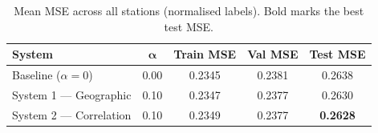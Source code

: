 \begin{table}[t]
  \centering
  \caption{Mean MSE across all stations (normalised labels). Bold marks the best test MSE.}
  \label{tab:results}
  \begin{tabular}{lcccc}
    \hline
    \textbf{System} & $\bm{\alpha}$ & \textbf{Train MSE} & \textbf{Val MSE} & \textbf{Test MSE} \\
    \hline
    Baseline ($\alpha=0$) & 0.00 & 0.2345 & 0.2381 & 0.2638 \\
    System 1 — Geographic & 0.10 & 0.2347 & 0.2377 & 0.2630 \\
    System 2 — Correlation & 0.10 & 0.2349 & 0.2377 & \textbf{0.2628} \\
    \hline
  \end{tabular}
\end{table}
